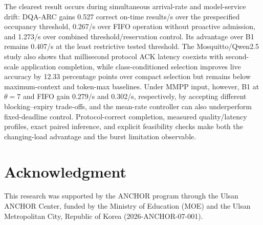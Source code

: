 \documentclass[journal]{IEEEtran}
\newcommand{\method}{DQA-ARC}
\begin{document}
The clearest result occurs during simultaneous arrival-rate and model-service drift: \method{} gains 0.527 correct on-time results/s over the prespecified occupancy threshold, 0.267/s over FIFO operation without proactive admission, and 1.273/s over combined threshold/reservation control. Its advantage over B1 remains 0.407/s at the least restrictive tested threshold. The Mosquitto/Qwen2.5 study also shows that millisecond protocol ACK latency coexists with second-scale application completion, while class-conditioned selection improves live accuracy by 12.33 percentage points over compact selection but remains below maximum-context and token-max baselines. Under MMPP input, however, B1 at $\theta=7$ and FIFO gain 0.279/s and 0.302/s, respectively, by accepting different blocking--expiry trade-offs, and the mean-rate controller can also underperform fixed-deadline control. Protocol-correct completion, measured quality/latency profiles, exact paired inference, and explicit feasibility checks make both the changing-load advantage and the burst limitation observable.

\section*{Acknowledgment}

This research was supported by the ANCHOR program through the Ulsan ANCHOR Center, funded by the Ministry of Education (MOE) and the Ulsan Metropolitan City, Republic of Korea (2026-ANCHOR-07-001).



\end{document}
